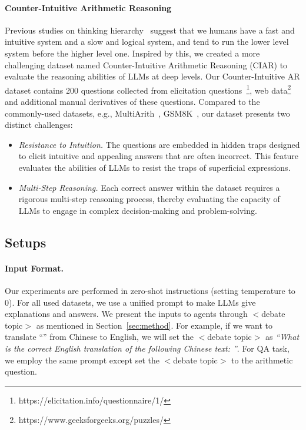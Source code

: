 \paragraph{Counter-Intuitive Arithmetic Reasoning}
Previous studies on thinking hierarchy~\citep{kahneman2011thinking} suggest that we humans have a fast and intuitive system and a slow and logical system, and tend to run the lower level system before the higher level one. Inspired by this, we created a more challenging dataset named Counter-Intuitive Arithmetic Reasoning (CIAR) to evaluate the reasoning abilities of LLMs at deep levels. 
Our Counter-Intuitive AR dataset contains 200 questions collected from elicitation 
questions~\citep{kong2022eliciting}\footnote{https://elicitation.info/questionnaire/1/}, 
web data\footnote{https://www.geeksforgeeks.org/puzzles/} and additional manual derivatives of these questions.
Compared to the commonly-used datasets, e.g., MultiArith~\citep{roy2015solving}, GSM8K~\citep{cobbe2021training},  our dataset presents two distinct challenges:
\begin{itemize}[leftmargin=10pt]
    \item \textit{Resistance to Intuition.} 
    The questions are embedded in hidden traps designed to elicit intuitive and appealing answers that are often incorrect. This feature evaluates the abilities of LLMs to resist the traps of superficial expressions.
    \item \textit{Multi-Step Reasoning.} 
    Each correct answer within the dataset requires a rigorous multi-step reasoning process, thereby evaluating the capacity of LLMs to engage in complex decision-making and problem-solving.
\end{itemize}

\subsection{Setups}
\paragraph{Input Format.}
Our experiments are performed in zero-shot instructions (setting temperature to 0).
For all used datasets, we use a unified prompt to make LLMs give explanations and answers.
We present the inputs to agents through $<$debate topic$>$ as mentioned in Section~\ref{sec:method}. For example, if we want to translate ``'' from Chinese to English, we will set the $<$debate topic$>$ as \textit{``What is the correct English translation of the following Chinese text: ''}. For QA task, we employ the same prompt except set the $<$debate topic$>$ to the arithmetic question.

